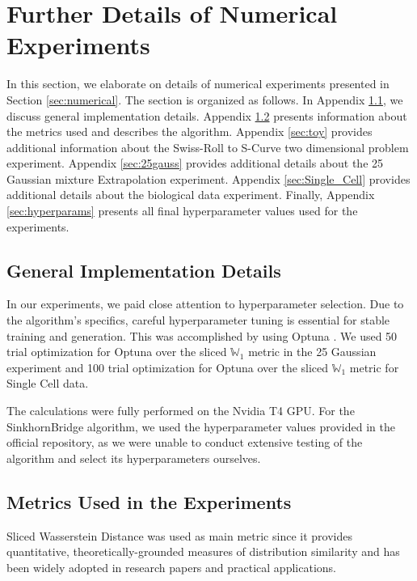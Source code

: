 \documentclass[11pt]{article}
\theoremstyle{remark}
\numberwithin{equation}{section}
\begin{document}
\section{Further Details of Numerical Experiments}
\label{sec:numerical_details}

In this section, we elaborate on details of numerical experiments presented in Section \ref{sec:numerical}.
The section is organized as follows. In Appendix \ref{sec:general}, we discuss general implementation details. Appendix \ref{sec:metrics} presents information about the metrics used and describes the algorithm. Appendix \ref{sec:toy} provides additional information about the Swiss-Roll to S-Curve two dimensional problem experiment. Appendix \ref{sec:25gauss} provides additional details about the 25 Gaussian mixture Extrapolation experiment. Appendix \ref{sec:Single_Cell} provides additional details about the biological data experiment. Finally, Appendix \ref{sec:hyperparams} presents all final hyperparameter values used for the experiments.

\subsection{General Implementation Details} \label{sec:general}

In our experiments, we paid close attention to hyperparameter selection. Due to the algorithm's specifics, careful hyperparameter tuning is essential for stable training and generation. This was accomplished by using Optuna \citep{Akiba2019}. We used 50 trial optimization for Optuna over the sliced $ \mathbb{W}_1 $ metric in the 25 Gaussian experiment and 100 trial optimization for Optuna over the sliced $ \mathbb{W}_1 $ metric for Single Cell data.

The calculations were fully performed on the Nvidia T4 GPU. For the SinkhornBridge algorithm, we used the hyperparameter values provided in the official repository, as we were unable to conduct extensive testing of the algorithm and select its hyperparameters ourselves.

\subsection{Metrics Used in the Experiments} \label{sec:metrics}

Sliced Wasserstein Distance was used as main metric since it provides quantitative, theoretically-grounded measures of distribution similarity and has been widely adopted in research papers and practical applications.
\end{document}
